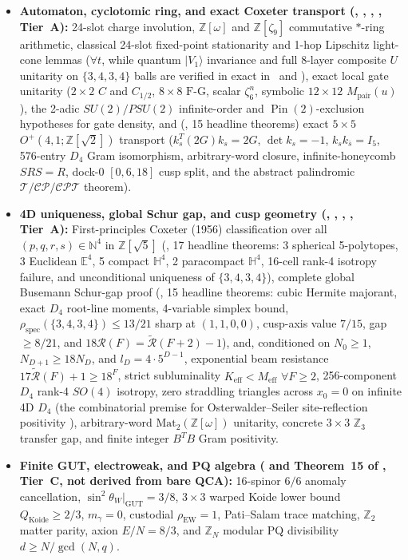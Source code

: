 \begin{itemize}
\item \textbf{Automaton, cyclotomic ring, and exact Coxeter transport (, , ,
, Tier~A):} 24-slot  charge involution, $\mathbb{Z}[\omega]$ and
$\mathbb{Z}[\zeta_9]$ commutative $*$-ring arithmetic, classical 24-slot  fixed-point stationarity and
1-hop Lipschitz light-cone lemmas ($\forall t$, while quantum $|V_1\rangle$ invariance and full 8-layer composite $U$
unitarity on $\{3,4,3,4\}$ balls are verified in exact  in \universecode\ and ), exact
local gate unitarity ($2 \times 2$ $C$ and $C_{1/2}$, $8 \times 8$ $\mathrm{F\text{-}G}$, scalar $\zeta_6^n$, symbolic
$12 \times 12$ $M_{\mathrm{pair}}(u)$), the 2-adic $SU(2)/PSU(2)$ infinite-order and $\operatorname{Pin}(2)$-exclusion
hypotheses for gate density, and (, 15 headline theorems) exact $5 \times 5$
$O^+(4,1; \mathbb{Z}[\sqrt{2}])$ transport ($k_s^T (2G) k_s = 2G$, $\det k_s = -1$, $k_s k_{\bar{s}} = I_5$,
576-entry $D_4$ Gram isomorphism, arbitrary-word closure, infinite-honeycomb $S R S = R$, dock-0 $[0, 6, 18]$ cusp
split, and the abstract palindromic $\mathcal{T}/\mathcal{CP}/\mathcal{CPT}$ theorem).
\item \textbf{4D uniqueness, global Schur gap, and cusp geometry (, ,
, , Tier~A):} First-principles Coxeter (1956) classification over all
$(p,q,r,s) \in \mathbb{N}^4$ in $\mathbb{Z}[\sqrt{5}]$ (, 17 headline theorems: 3 spherical
5-polytopes, 3 Euclidean $\mathbb{E}^4$, 5 compact $\mathbb{H}^4$, 2 paracompact $\mathbb{H}^4$, 16-cell rank-4
isotropy failure, and unconditional uniqueness of $\{3,4,3,4\}$), complete global Busemann Schur-gap proof
(, 15 headline theorems: cubic Hermite majorant, exact $D_4$ root-line moments, 4-variable simplex
bound, $\rho_{\mathrm{spec}}(\{3,4,3,4\}) \le 13/21$ sharp at $(1,1,0,0)$, cusp-axis value $7/15$, gap $\ge 8/21$,
and $18\mathcal{R}(F) = \tilde{\mathcal{R}}(F+2) - 1$), and, conditioned on $N_0 \ge 1$, $N_{D+1} \ge 18 N_D$, and
$l_D = 4 \cdot 5^{D-1}$, exponential beam resistance $17\tilde{\mathcal{R}}(F) + 1 \ge 18^F$, strict subluminality
$K_{\mathrm{eff}} < M_{\mathrm{eff}}$ $\forall F \ge 2$, 256-component $D_4$ rank-4 $SO(4)$ isotropy, zero straddling
triangles across $x_0 = 0$ on infinite 4D $D_4$ (the combinatorial premise for Osterwalder--Seiler site-reflection
positivity \cite{osterwalder1978, seiler1982}), arbitrary-word $\mathrm{Mat}_2(\mathbb{Z}[\omega])$ unitarity,
concrete $3 \times 3$ $\mathbb{Z}_3$ transfer gap, and finite integer $B^T B$ Gram positivity.
\item \textbf{Finite GUT, electroweak, and PQ algebra ( and Theorem~15 of , Tier~C, not
derived from bare QCA):} 16-spinor $6/6$ anomaly cancellation, $\sin^2\theta_W|_{\mathrm{GUT}} = 3/8$, $3 \times 3$
warped Koide lower bound $Q_{\mathrm{Koide}} \ge 2/3$, $m_\gamma = 0$, custodial $\rho_{\mathrm{EW}} = 1$, Pati--Salam
trace matching, $\mathbb{Z}_2$ matter parity, axion $E/N = 8/3$, and $\mathbb{Z}_N$ modular PQ divisibility
$d \ge N/\gcd(N, q)$.
\end{itemize}


